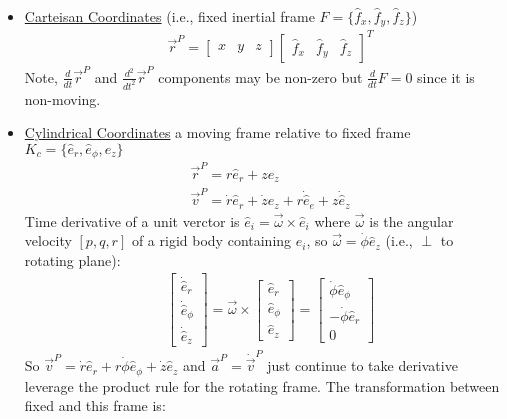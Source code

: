 \documentclass[conference]{IEEEtran}
\begin{document}
\begin{itemize}
   \item \underline{Carteisan Coordinates} (i.e., fixed inertial frame $F = \{\hat{f}_x, \hat{f}_y, \hat{f}_z\}$) \begin{align*}
   & \vec{r}^P = \begin{bmatrix} x & y & z\end{bmatrix} \begin{bmatrix} \hat{f}_x & \hat{f}_y & \hat{f}_z \end{bmatrix}^T
   \end{align*}
   Note, $\frac{d}{dt}\vec{r}^P$ and $\frac{d^2}{dt^2}\vec{r}^P$ components may be non-zero but $\frac{d}{dt}F = 0$ since it is non-moving.
   \item \underline{Cylindrical Coordinates} a moving frame relative to fixed frame $K_c = \{\hat{e}_r, \hat{e}_\phi, \hat{e}_z\}$ \begin{align*}
   & \vec{r}^P = r \hat{e}_r + z \hat{e}_z \\
   & \vec{v}^P = \dot{r}\hat{e}_r + \dot{z}\hat{e}_z + r \dot{\hat{e}}_e + z \dot{\hat{e}}_z 
   \end{align*}
Time derivative of a unit verctor is $\hat{e}_i = \vec{\omega} \times \hat{e}_i$ where $\vec{\omega}$ is the angular velocity $[p, q, r]$ of a rigid body containing $\hat{e}_i$, so $\vec{\omega} = \dot{\phi} \hat{e}_z$ (i.e., $\perp$ to rotating plane):
   \begin{align*}
    & \begin{bmatrix} \dot{\hat{e}}_r \\ \dot{\hat{e}}_\phi \\ \dot{\hat{e}}_z \end{bmatrix} = \vec{\omega} \times \begin{bmatrix} \hat{e}_r \\ \hat{e}_\phi \\ \hat{e}_z \end{bmatrix} = \begin{bmatrix} \dot{\phi} \hat{e}_\phi \\ -\dot{\phi} \hat{e}_r \\ 0 \end{bmatrix}
   \end{align*}
   So $\vec{v}^P = \dot{r} \hat{e}_r + r \dot{\phi} \hat{e}_{\phi} + \dot{z}\hat{e}_z$ and $\vec{a}^P = \dot{\vec{v}}^P$ just continue to take derivative leverage the product rule for the rotating frame. The transformation between fixed and this frame is:
   \begin{align*}

\end{align*}
\end{itemize}
\end{document}
